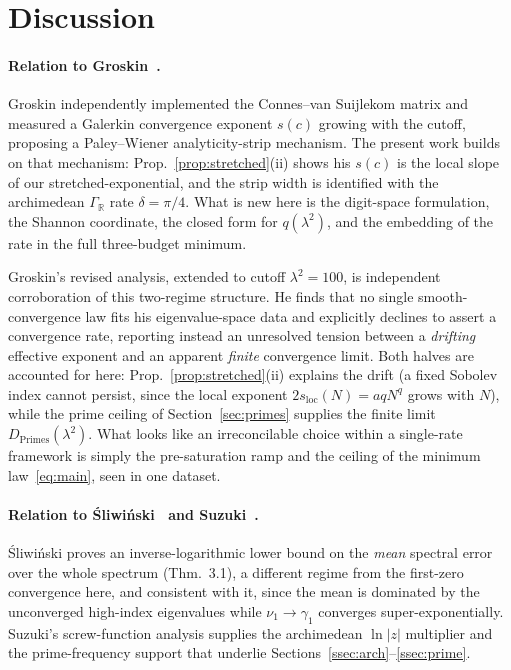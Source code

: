 \documentclass[11pt,a4paper]{article}
\begin{document}
\section{Discussion}\label{sec:discussion}

\paragraph{Relation to Groskin~\cite{Groskin2026}.}
Groskin independently implemented the Connes--van Suijlekom matrix and measured
a Galerkin convergence exponent $s(c)$ growing with the cutoff, proposing a
Paley--Wiener analyticity-strip mechanism. The present work builds on that
mechanism: Prop.~\ref{prop:stretched}(ii) shows his $s(c)$ is the local slope of our
stretched-exponential, and the strip width is identified with the archimedean
$\Gamma_\mathbb{R}$ rate $\delta=\pi/4$. What is new here is the digit-space
formulation, the Shannon coordinate, the closed form for $q(\lambda^2)$, and the
embedding of the rate in the full three-budget minimum.

Groskin's revised analysis, extended to cutoff $\lambda^2=100$, is independent
corroboration of this two-regime structure. He finds that no single
smooth-convergence law fits his eigenvalue-space data and explicitly declines to
assert a convergence rate, reporting instead an unresolved tension between a
\emph{drifting} effective exponent and an apparent \emph{finite} convergence
limit. Both halves are accounted for here: Prop.~\ref{prop:stretched}(ii) explains
the drift (a fixed Sobolev index cannot persist, since the local exponent
$2s_{\mathrm{loc}}(N)=aqN^{q}$ grows with $N$), while the prime ceiling of
Section~\ref{sec:primes} supplies the finite limit $D_{\mathrm{Primes}}(\lambda^2)$.
What looks like an irreconcilable choice within a single-rate framework is simply
the pre-saturation ramp and the ceiling of the minimum law~\eqref{eq:main}, seen
in one dataset.

\paragraph{Relation to \'Sliwi\'nski~\cite{Sliwinski2026} and Suzuki~\cite{Suzuki2026}.}
\'Sliwi\'nski proves an inverse-logarithmic lower bound on the \emph{mean}
spectral error over the whole spectrum (Thm.~3.1), a different regime from the
first-zero convergence here, and consistent with it, since the mean is dominated
by the unconverged high-index eigenvalues while $\nu_1\to\gamma_1$ converges
super-exponentially. Suzuki's screw-function analysis supplies the archimedean
$\ln|z|$ multiplier and the prime-frequency support that underlie
Sections~\ref{ssec:arch}--\ref{ssec:prime}.
\end{document}
